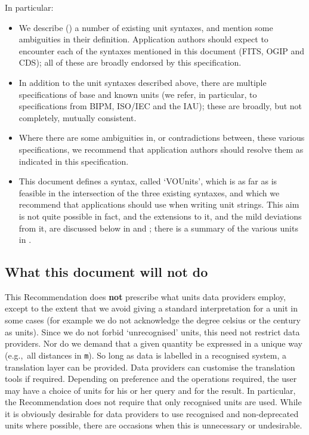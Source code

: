 \documentclass[11pt,a4paper]{ivoa}
\newcommand{\unit}[1]{\texttt{\small\color{orange}#1}}
\def\eg{e.g.,~}
\begin{document}
In particular:
\begin{itemize}
\item We describe () a number of existing unit
  syntaxes, and mention some ambiguities in their
  definition. Application authors should expect to encounter each of
  the syntaxes mentioned in this document (FITS, OGIP and CDS); all of
  these are broadly endorsed by this specification.
\item In addition to the unit syntaxes described above, there are
  multiple specifications of base and known units
  (we refer, in particular, to
  specifications from BIPM, ISO/IEC and the IAU);
  these are broadly, but not completely, mutually consistent.
\item Where there are some ambiguities in, or contradictions between,
  these various specifications, we recommend that application authors should
  resolve them as indicated in this specification.
\item This document defines a syntax, called `VOUnits', which is as
  far as is feasible in the intersection of the three existing
  syntaxes, and which we recommend that applications should use when
  writing unit strings.  This aim is not quite possible in fact, and
  the extensions to it, and the mild deviations from it, are discussed
  below in  and ;
  there is a summary of the various units
  in .
\end{itemize}




\subsection{What this document will not do}
\label{sec:outofscope}

This Recommendation does \textbf{not} prescribe what units data
providers employ, except to the extent that we avoid giving a standard
interpretation for a unit in some cases (for example we do not
acknowledge the degree celsius or the century as units).  Since we do
not forbid `unrecognised' units, this need not restrict data providers.
Nor do we demand that a given quantity be expressed in a
unique way (\eg all distances in \unit{m}).  So long as data is
labelled in a recognised system, a translation layer can be
provided. Data providers can customise the translation tools if
required. Depending on preference and the operations required, the
user may have a choice of units for his or her query and for the
result.  In particular, the Recommendation does not require that only
recognised units are used.  While it is obviously desirable for data
providers to use recognised and non-deprecated units where possible,
there are occasions when this is unnecessary or undesirable.
\end{document}
